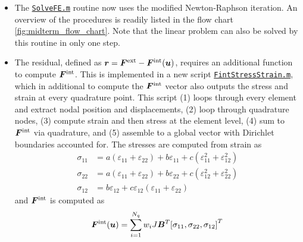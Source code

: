\begin{enumerate}[(a)]
{\begin{itemize}
{        The assembly remains identical to linear elasticity. 
        The global tangent matrix is only updated every load step, as per modified Newton method. 
        This can be easily converted to Newton-Raphson by calling \href{https://github.com/sy-cui/CSE552-FA2024/blob/c04ab3122ea2a02fc06ec6a7ca4273ec5cab4077/midterm/SolveFE.m}{\texttt{FormFE.m}} inside the solution loop in \href{https://github.com/sy-cui/CSE552-FA2024/blob/c04ab3122ea2a02fc06ec6a7ca4273ec5cab4077/midterm/SolveFE.m}{\texttt{SolveFE.m}} with properly parsed displacement input (the code in included but commented out). 
    }
    \item {
        The \href{https://github.com/sy-cui/CSE552-FA2024/blob/c04ab3122ea2a02fc06ec6a7ca4273ec5cab4077/midterm/SolveFE.m}{\texttt{SolveFE.m}} routine now uses the modified Newton-Raphson iteration. 
        An overview of the procedures is readily listed in the flow chart \cref{fig:midterm_flow_chart}. 
        Note that the linear problem can also be solved by this routine in only one step.
    }
    \item {
        The residual, defined as $\bm{r} = \bm{F}^{\textrm{ext}} - \bm{F}^{\textrm{int}}(\bm{u})$, requires an additional function to compute $\bm{F}^{\textrm{int}}$.
        This is implemented in a new script \href{https://github.com/sy-cui/CSE552-FA2024/blob/c04ab3122ea2a02fc06ec6a7ca4273ec5cab4077/midterm/FintStressStrain.m#L95}{\texttt{FintStressStrain.m}}, which in additional to compute the $\bm{F}^{\textrm{int}}$ vector also outputs the stress and strain at every quadrature point. 
        This script (1) loops through every element and extract nodal position and displacements, (2) loop through quadrature nodes, (3) compute strain and then stress at the element level, (4) sum to $\bm{F}^{\textrm{int}}$ via quadrature, and (5) assemble to a global vector with Dirichlet boundaries accounted for. 
        The stresses are computed from strain as 
        \begin{equation}
        \begin{aligned}
            \sigma_{11} &= a(\varepsilon_{11}+\varepsilon_{22}) + b\varepsilon_{11} + c(\varepsilon_{11}^2 + \varepsilon_{12}^2) \\
            \sigma_{22} &= a(\varepsilon_{11}+\varepsilon_{22}) + b\varepsilon_{22} + c(\varepsilon_{12}^2 + \varepsilon_{22}^2) \\
            \sigma_{12} &= b\varepsilon_{12} + c\varepsilon_{12}(\varepsilon_{11} + \varepsilon_{22})
        \end{aligned}
        \end{equation}
        and $\bm{F}^{\textrm{int}}$ is computed as 
        \begin{equation}
            \bm{F}^{\textrm{int}}(\bm{u}) = \sum_{i=1}^{N_q} w_i J \bm{B}^T {[\sigma_{11}, \sigma_{22}, \sigma_{12}]}^T
        \end{equation}
    }
\end{itemize}
}
\end{enumerate}

